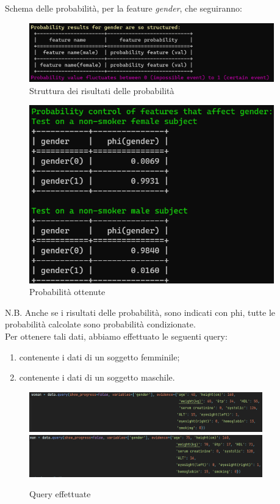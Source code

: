\documentclass{article}
\begin{document}
\noindent
Schema delle probabilità, per la feature \textit{gender}, che seguiranno:
\begin{figure}[H]
        \includegraphics[width=10.6cm]{schema1}
        \centering
        \caption{Struttura dei risultati delle probabilità}
        \centering
\end{figure}

\begin{figure}[H]
        \includegraphics[width=10.6cm]{notSmokeGen}
        \centering
        \caption{Probabilità ottenute}
        \centering
\end{figure}

\noindent
N.B. Anche se i risultati delle probabilità, sono indicati con phi, tutte le probabilità calcolate sono probabilità condizionate.\\

Per ottenere tali dati, abbiamo effettuato le seguenti query:
\begin{enumerate}
    \item contenente i dati di un soggetto femminile;
    \item contenente i dati di un soggetto maschile.
\end{enumerate}
\begin{figure}[H]
        \includegraphics[width=0.9\textwidth]{queryWomanNoTSmoke}
        \includegraphics[width=0.9\textwidth]{queryManNoTSmoke}
        \centering
        \caption{Query effettuate}
        \centering
\end{figure}
%
\end{document}
